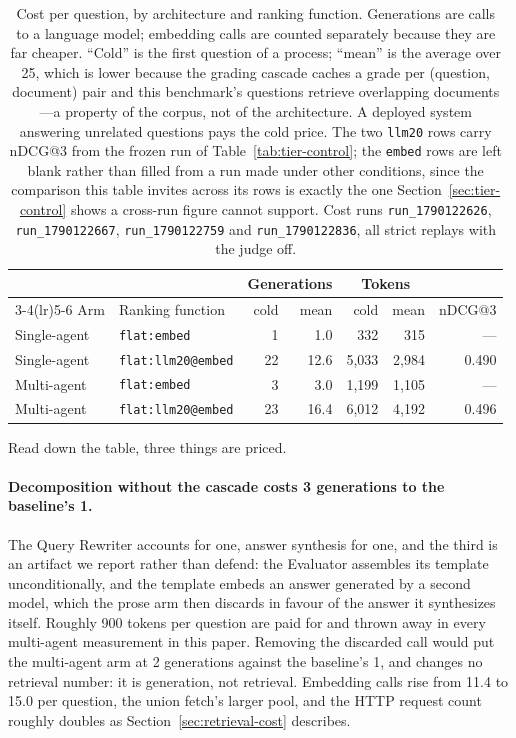 \documentclass[acmsmall,review,anonymous,screen]{acmart}
\begin{document}
\begin{table}[t]
\caption{Cost per question, by architecture and ranking function. Generations
are calls to a language model; embedding calls are counted separately because
they are far cheaper. ``Cold'' is the first question of a process; ``mean'' is
the average over 25, which is lower because the grading cascade caches a grade
per (question, document) pair and this benchmark's questions retrieve
overlapping documents---a property of the corpus, not of the architecture. A
deployed system answering unrelated questions pays the cold price. The two
\texttt{llm20} rows carry nDCG@3 from the frozen run of
Table~\ref{tab:tier-control}; the \texttt{embed} rows are left blank rather
than filled from a run made under other conditions, since the comparison this
table invites across its rows is exactly the one
Section~\ref{sec:tier-control} shows a cross-run figure cannot support. Cost
runs \texttt{run\_1790122626},
\texttt{run\_1790122667}, \texttt{run\_1790122759} and
\texttt{run\_1790122836}, all strict replays with the judge off.}
\label{tab:cost}
\begin{tabular}{llrrrrr}
\toprule
& & \multicolumn{2}{c}{Generations} & \multicolumn{2}{c}{Tokens} & \\
\cmidrule(lr){3-4}\cmidrule(lr){5-6}
Arm & Ranking function & cold & mean & cold & mean & nDCG@3 \\
\midrule
Single-agent & \texttt{flat:embed}       &  1 &  1.0 &   332 &   315 & --- \\
Single-agent & \texttt{flat:llm20@embed} & 22 & 12.6 & 5{,}033 & 2{,}984 & 0.490 \\
Multi-agent  & \texttt{flat:embed}       &  3 &  3.0 & 1{,}199 & 1{,}105 & --- \\
Multi-agent  & \texttt{flat:llm20@embed} & 23 & 16.4 & 6{,}012 & 4{,}192 & 0.496 \\
\bottomrule
\end{tabular}
\end{table}

Read down the table, three things are priced.

\paragraph{Decomposition without the cascade costs 3 generations to the
baseline's 1.} The Query Rewriter accounts for one, answer synthesis for one,
and the third is an artifact we report rather than defend: the Evaluator
assembles its template unconditionally, and the template embeds an answer
generated by a second model, which the prose arm then discards in favour of the
answer it synthesizes itself. Roughly 900 tokens per question are paid for and
thrown away in every multi-agent measurement in this paper. Removing the
discarded call would put the multi-agent arm at 2 generations against the
baseline's 1, and changes no retrieval number: it is generation, not retrieval.
Embedding calls rise from 11.4 to 15.0 per question, the union fetch's larger
pool, and the HTTP request count roughly doubles as
Section~\ref{sec:retrieval-cost} describes.
\end{document}
